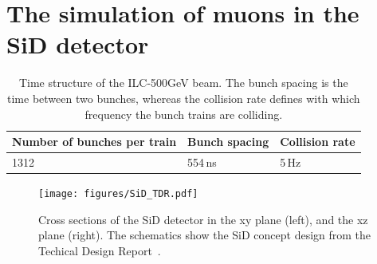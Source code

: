 \section{The simulation of muons in the SiD detector}
\label{Detector}

\begin{table}
\caption[Time structure of the ILC-500GeV beam.]{Time structure of the ILC-500GeV beam. The bunch spacing is the time between two bunches, whereas the collision rate defines with which frequency the bunch trains are colliding.}
\label{tab:Beam_TimeStructure}
\begin{tabularx}{\textwidth}{lll}
\hline\hline
\textbf{Number of bunches per train} & \textbf{Bunch spacing} &  \textbf{Collision rate} \tabularnewline
\hline
1312 & \unit{554}\,{ns} & \unit{5}\,{Hz}\tabularnewline
\hline\hline
\end{tabularx}
\end{table}

\begin{figure}
    \centering
    \texttt{[image: figures/SiD\_TDR.pdf]}
    \caption[SiD detector cross sections]{
    Cross sections of the SiD detector in the xy plane (left), and the xz plane (right).
    The schematics show the SiD concept design from the Techical Design Report~\cite[p. 59]{TDR4}.
    }
    \label{fig:SiD}
\end{figure}

